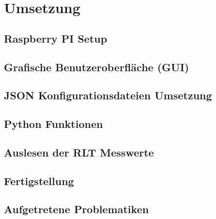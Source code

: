 \ifoot{\pezze}
\chapter{Umsetzung} 

\section{Raspberry PI Setup}


\newpage
\ifoot{\pezze}
\section{Grafische Benutzeroberfläche (GUI)}\label{gui_design}

\newpage


\newpage
\ifoot{\pezze}
\section{JSON Konfigurationsdateien Umsetzung}
%


\newpage
\ifoot{\schneider}


\newpage
\ifoot{\pezze}
\section{Python Funktionen}


\newpage
\ifoot{\schneider}
\section{Auslesen der RLT Messwerte}


\section{Fertigstellung}



\newpage
\ifoot{\pezze}



\newpage
\ifoot{\mangeng}
\section{Aufgetretene Problematiken}

